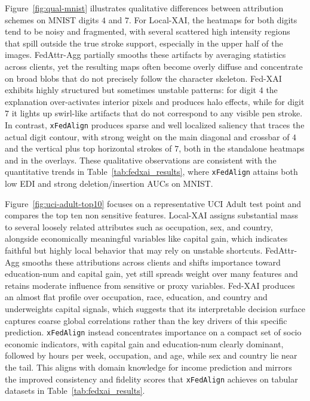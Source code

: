 \documentclass{article}
\theoremstyle{plain}
\theoremstyle{definition}
\theoremstyle{remark}
\begin{document}
Figure~\ref{fig:qual-mnist} illustrates qualitative differences between attribution schemes on MNIST digits $4$ and $7$. For Local-XAI, the heatmaps for both digits tend to be noisy and fragmented, with several scattered high intensity regions that spill outside the true stroke support, especially in the upper half of the images. FedAttr-Agg partially smooths these artifacts by averaging statistics across clients, yet the resulting maps often become overly diffuse and concentrate on broad blobs that do not precisely follow the character skeleton. Fed-XAI exhibits highly structured but sometimes unstable patterns: for digit $4$ the explanation over-activates interior pixels and produces halo effects, while for digit $7$ it lights up swirl-like artifacts that do not correspond to any visible pen stroke. In contrast, \texttt{xFedAlign} produces sparse and well localized saliency that traces the actual digit contour, with strong weight on the main diagonal and crossbar of $4$ and the vertical plus top horizontal strokes of $7$, both in the standalone heatmaps and in the overlays. These qualitative observations are consistent with the quantitative trends in Table~\ref{tab:fedxai_results}, where \texttt{xFedAlign} attains both low EDI and strong deletion/insertion AUCs on MNIST.

Figure~\ref{fig:uci-adult-top10} focuses on a representative UCI Adult test point and compares the top ten non sensitive features. Local-XAI assigns substantial mass to several loosely related attributes such as occupation, sex, and country, alongside economically meaningful variables like capital gain, which indicates faithful but highly local behavior that may rely on unstable shortcuts. FedAttr-Agg smooths these attributions across clients and shifts importance toward education-num and capital gain, yet still spreads weight over many features and retains moderate influence from sensitive or proxy variables. Fed-XAI produces an almost flat profile over occupation, race, education, and country and underweights capital signals, which suggests that its interpretable decision surface captures coarse global correlations rather than the key drivers of this specific prediction. \texttt{xFedAlign} instead concentrates importance on a compact set of socio economic indicators, with capital gain and education-num clearly dominant, followed by hours per week, occupation, and age, while sex and country lie near the tail. This aligns with domain knowledge for income prediction and mirrors the improved consistency and fidelity scores that \texttt{xFedAlign} achieves on tabular datasets in Table~\ref{tab:fedxai_results}.
\end{document}
